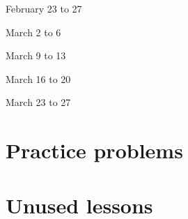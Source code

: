\documentclass{./guidednotes/guidednotes}
\theoremstyle{definition}
\begin{document}
\begin{week}{February 23 to 27} %
   \clearpage
   \clearpage
\end{week}

\begin{week}{March 2 to 6} %
   \clearpage
   \clearpage
\end{week}

\begin{week}{March 9 to 13} %
   \clearpage
   \clearpage
   \clearpage
   \clearpage
   \clearpage
\end{week}

\begin{week}{March 16 to 20} %
   \clearpage
   \clearpage
   \clearpage
   \clearpage
\end{week}

\begin{week}{March 23 to 27} %
   \clearpage
   \clearpage
   \clearpage
   \clearpage
\end{week}

\appendix
\chapter{Practice problems}
 \clearpage
 \clearpage
 \clearpage
 \clearpage
 \clearpage
 \clearpage
 \clearpage
 \clearpage
 \clearpage
 \clearpage

\chapter{Unused lessons}
 \clearpage
 \clearpage
 \clearpage
\end{document}
